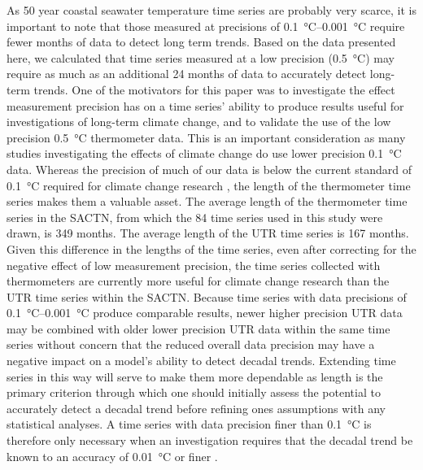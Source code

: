 \documentclass[twocol]{ametsoc}
\begin{document}
As 50 year coastal seawater temperature time series are probably very scarce, it is important to note that those measured at precisions of \SIrange{0.1}{0.001}{\degreeCelsius} require fewer months of data to detect long term trends. Based on the data presented here, we calculated that time series measured at a low precision (\SI{0.5}{\degreeCelsius}) may require as much as an additional 24 months of data to accurately detect long-term trends. One of the motivators for this paper was to investigate the effect measurement precision has on a time series' ability to produce results useful for investigations of long-term climate change, and to validate the use of the low precision \SI{0.5}{\degreeCelsius} thermometer data. This is an important consideration as many studies investigating the effects of climate change \citep[\emph{e.g.}][]{Grant2010, Scherrer2010, Lathlean2012} do use lower precision \SI{0.1}{\degreeCelsius} data. Whereas the precision of much of our data is below the current standard of \SI{0.1}{\degreeCelsius} required for climate change research \citep{Ohring2005,Jarraud2008}, the length of the thermometer time series makes them a valuable asset. The average length of the thermometer time series in the SACTN, from which the 84 time series used in this study were drawn, is 349 months. The average length of the UTR time series is 167 months. Given this difference in the lengths of the time series, even after correcting for the negative effect of low measurement precision, the time series collected with thermometers are currently more useful for climate change research than the UTR time series within the SACTN. Because time series with data precisions of \SIrange{0.1}{0.001}{\degreeCelsius} produce comparable results, newer higher precision UTR data may be combined with older lower precision UTR data within the same time series without concern that the reduced overall data precision may have a negative impact on a model's ability to detect decadal trends. Extending time series in this way will serve to make them more dependable as length is the primary criterion through which one should initially assess the potential to accurately detect a decadal trend before refining ones assumptions with any statistical analyses. A time series with data precision finer than \SI{0.1}{\degreeCelsius} is therefore only necessary when an investigation requires that the decadal trend be known to an accuracy of \SI{0.01}{\degreeCelsius} or finer \citep[\emph{e.g.}][]{Karl2015}.
\end{document}
